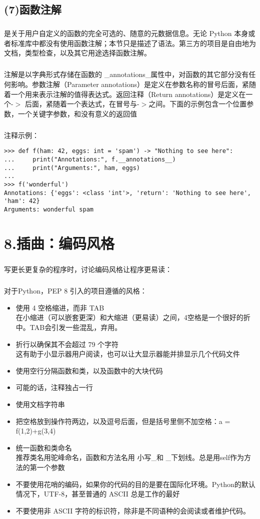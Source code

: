 \documentclass{article}
\begin{document}
\begin{CJK}{UTF8}{gbsn}
\subsection*{(7)函数注解}
\subparagraph*{}
是关于用户自定义的函数的完全可选的、随意的元数据信息。无论 Python 本身或者标准库中都没有使用函数注解；本节只是描述了语法。第三方的项目是自由地为文档，类型检查，以及其它用途选择函数注解。
\subparagraph*{}
注解是以字典形式存储在函数的 \_{}annotations\_{}属性中，对函数的其它部分没有任何影响。参数注解（Parameter annotations）是定义在参数名称的冒号后面，紧随着一个用来表示注解的值得表达式。返回注释（Return annotations）是定义在一个-$>$ 后面，紧随着一个表达式，在冒号与-$>$之间。下面的示例包含一个位置参数，一个关键字参数，和没有意义的返回值
\subparagraph*{}
注释示例：
\begin{verbatim}
>>> def f(ham: 42, eggs: int = 'spam') -> "Nothing to see here":
...     print("Annotations:", f.__annotations__)
...     print("Arguments:", ham, eggs)
...
>>> f('wonderful')
Annotations: {'eggs': <class 'int'>, 'return': 'Nothing to see here', 'ham': 42}
Arguments: wonderful spam
\end{verbatim}
\section*{8.插曲：编码风格}
\subparagraph*{}
写更长更复杂的程序时，讨论编码风格让程序更易读：
\subparagraph*{}
对于Python，PEP 8 引入的项目遵循的风格：
\begin{itemize}
  \item 使用 4 空格缩进，而非 TAB\\
  在小缩进（可以嵌套更深）和大缩进（更易读）之间，4空格是一个很好的折中。TAB会引发一些混乱，弃用。
  \item 折行以确保其不会超过 79 个字符\\
  这有助于小显示器用户阅读，也可以让大显示器能并排显示几个代码文件
  \item 使用空行分隔函数和类，以及函数中的大块代码
  \item 可能的话，注释独占一行
  \item 使用文档字符串
  \item 把空格放到操作符两边，以及逗号后面，但是括号里侧不加空格：a = f(1,2)+g(3,4)
  \item 统一函数和类命名\\
  推荐类名用驼峰命名，函数和方法名用 小写\_{}和
  \_{}下划线。总是用self作为方法的第一个参数
  \item 不要使用花哨的编码，如果你的代码的目的是要在国际化环境。Python的默认情况下，UTF-8，甚至普通的 ASCII 总是工作的最好
  \item 不要使用非 ASCII 字符的标识符，除非是不同语种的会阅读或者维护代码。
\end{itemize}

\end{CJK}
\end{document}
